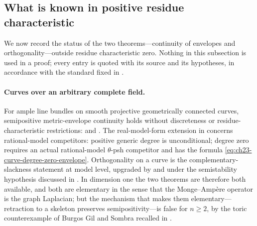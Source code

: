 \subsection{What is known in positive residue characteristic}
\label{sec:ch27-positive-characteristic}

We now record the status of the two theorems---continuity of envelopes and
orthogonality---outside residue characteristic zero.  Nothing in this
subsection is used in a proof; every entry is quoted with its source and its
hypotheses, in accordance with the standard fixed in
.

\paragraph{Curves over an arbitrary complete field.}
For ample line bundles on smooth projective geometrically connected
curves, semipositive metric-envelope continuity holds without discreteness
or residue-characteristic restrictions:
\cite[Theorem~1.1]{GJKM19} and .
The real-model-form extension in  concerns
rational-model competitors: positive generic degree is unconditional;
degree zero requires an actual rational-model \(\theta\)-psh competitor
and has the formula \eqref{eq:ch23-curve-degree-zero-envelope}.
Orthogonality on a curve is the complementary-slackness statement
 at model level, upgraded by
 and
 under the semistability
hypothesis discussed in .  In dimension one
the two theorems are therefore both available, and both are elementary in
the sense that the Monge--Amp\`ere operator is the graph Laplacian; but
the mechanism that makes them elementary---retraction to a skeleton
preserves semipositivity---is false for \(n\geq2\), by the toric
counterexample of Burgos Gil and Sombra recalled in
.

